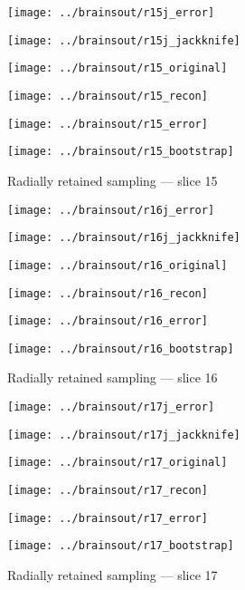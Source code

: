 \documentclass[review,supplement,onefignum,onetabnum,juq]{siamonline181217}
\begin{document}
\begin{figure}
\begin{centering}

\parbox{\imsize}{\texttt{[image: ../brainsout/r15j\_error]}}
\parbox{\imsize}{\texttt{[image: ../brainsout/r15j\_jackknife]}}

\vspace{\vertsep}

\parbox{\imsize}{\texttt{[image: ../brainsout/r15\_original]}}
\parbox{\imsize}{\texttt{[image: ../brainsout/r15\_recon]}}

\vspace{\vertsep}

\parbox{\imsize}{\texttt{[image: ../brainsout/r15\_error]}}
\parbox{\imsize}{\texttt{[image: ../brainsout/r15\_bootstrap]}}

\end{centering}
\caption{Radially retained sampling --- slice 15}
\end{figure}


\begin{figure}
\begin{centering}

\parbox{\imsize}{\texttt{[image: ../brainsout/r16j\_error]}}
\parbox{\imsize}{\texttt{[image: ../brainsout/r16j\_jackknife]}}

\vspace{\vertsep}

\parbox{\imsize}{\texttt{[image: ../brainsout/r16\_original]}}
\parbox{\imsize}{\texttt{[image: ../brainsout/r16\_recon]}}

\vspace{\vertsep}

\parbox{\imsize}{\texttt{[image: ../brainsout/r16\_error]}}
\parbox{\imsize}{\texttt{[image: ../brainsout/r16\_bootstrap]}}

\end{centering}
\caption{Radially retained sampling --- slice 16}
\end{figure}


\begin{figure}
\begin{centering}

\parbox{\imsize}{\texttt{[image: ../brainsout/r17j\_error]}}
\parbox{\imsize}{\texttt{[image: ../brainsout/r17j\_jackknife]}}

\vspace{\vertsep}

\parbox{\imsize}{\texttt{[image: ../brainsout/r17\_original]}}
\parbox{\imsize}{\texttt{[image: ../brainsout/r17\_recon]}}

\vspace{\vertsep}

\parbox{\imsize}{\texttt{[image: ../brainsout/r17\_error]}}
\parbox{\imsize}{\texttt{[image: ../brainsout/r17\_bootstrap]}}

\end{centering}
\caption{Radially retained sampling --- slice 17}
\end{figure}
\end{document}
